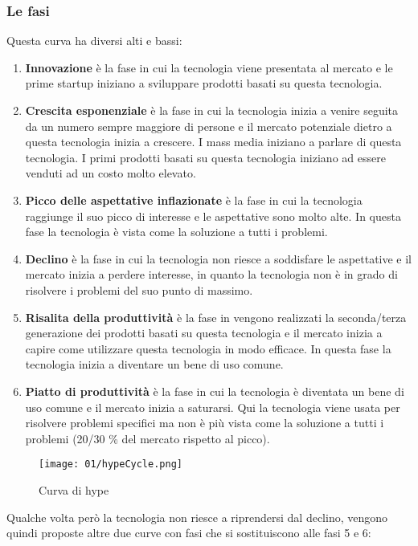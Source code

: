         \subsubsection{Le fasi}
            Questa curva ha diversi alti e bassi:
            \begin{enumerate}
                \item \textbf{Innovazione} è la fase in cui la tecnologia viene presentata al mercato e le prime startup iniziano a sviluppare prodotti basati su questa tecnologia.
                \item \textbf{Crescita esponenziale} è la fase in cui la tecnologia inizia a venire seguita da un numero sempre maggiore di persone e il mercato potenziale dietro a questa tecnologia inizia a crescere. I mass media iniziano a parlare di questa tecnologia. I primi prodotti basati su questa tecnologia iniziano ad essere venduti ad un costo molto elevato.
                \item \textbf{Picco delle aspettative inflazionate} è la fase in cui la tecnologia raggiunge il suo picco di interesse e le aspettative sono molto alte. In questa fase la tecnologia è vista come la soluzione a tutti i problemi.
                \item \textbf{Declino} è la fase in cui la tecnologia non riesce a soddisfare le aspettative e il mercato inizia a perdere interesse, in quanto la tecnologia non è in grado di risolvere i problemi del suo punto di massimo.
                \item \textbf{Risalita della produttività} è la fase in vengono realizzati la seconda/terza generazione dei prodotti basati su questa tecnologia e il mercato inizia a capire come utilizzare questa tecnologia in modo efficace. In questa fase la tecnologia inizia a diventare un bene di uso comune.
                \item \textbf{Piatto di produttività} è la fase in cui la tecnologia è diventata un bene di uso comune e il mercato inizia a saturarsi. Qui la tecnologia viene usata per risolvere problemi specifici ma non è più vista come la soluzione a tutti i problemi (20/30 \% del mercato rispetto al picco).
            \end{enumerate}
            \begin{figure}[H]
                \centering
                \texttt{[image: 01/hypeCycle.png]}
                \caption{Curva di hype}
            \end{figure}
            Qualche volta però la tecnologia non riesce a riprendersi dal declino, vengono quindi proposte altre due curve con fasi che si sostituiscono alle fasi 5 e 6:

